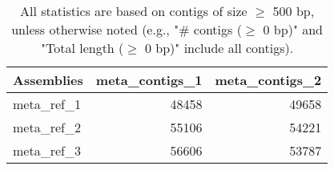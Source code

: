 \documentclass[12pt,a4paper]{article}
\begin{document}
\begin{table}[ht]
\begin{center}
\caption{All statistics are based on contigs of size $\geq$ 500 bp, unless otherwise noted (e.g., "\# contigs ($\geq$ 0 bp)" and "Total length ($\geq$ 0 bp)" include all contigs).}
\begin{tabular}{|l*{2}{|r}|}
\hline
Assemblies & meta\_contigs\_1 & meta\_contigs\_2 \\ \hline
meta\_ref\_1 & 48458 & 49658 \\ \hline
meta\_ref\_2 & 55106 & 54221 \\ \hline
meta\_ref\_3 & 56606 & 53787 \\ \hline
\end{tabular}
\end{center}
\end{table}
\end{document}
